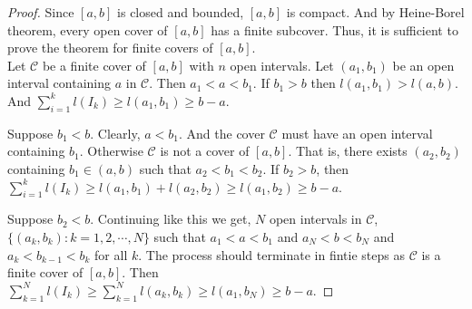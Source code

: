\begin{enumerate}
\begin{proof}
		Since $[a,b]$ is closed and bounded, $[a,b]$ is compact. And by Heine-Borel theorem, every open cover of $[a,b]$ has a finite subcover. Thus, it is sufficient to prove the theorem for finite covers of $[a,b]$.\\

		Let $\mathcal{C}$ be a finite cover of $[a,b]$ with $n$ open intervals. Let $(a_1,b_1)$ be an open interval containing $a$ in $\mathcal{C}$. Then $a_1 < a < b_1$. If $b_1 > b$ then $l(a_1,b_1) > l(a,b)$. And $\sum_{i=1}^k l(I_k) \ge l(a_1,b_1) \ge b-a$.

\begin{center}
\end{center}

		Suppose $b_1 < b$. Clearly, $a < b_1$. And the cover $\mathcal{C}$ must have an open interval containing $b_1$. Otherwise $\mathcal{C}$ is not a cover of $[a,b]$. That is, there exists $(a_2,b_2)$ containing $b_1 \in (a,b)$ such that $a_2 < b_1 < b_2$. If $b_2 > b$, then $\sum_{i=1}^k l(I_k) \ge l(a_1,b_1) + l(a_2,b_2) \ge l(a_1,b_2) \ge b-a$.

\begin{center}
\end{center}

		Suppose $b_2 < b$. Continuing like this we get, $N$ open intervals in $\mathcal{C}$, $\{ (a_k,b_k) : k = 1,2,\cdots,N \} $ such that $a_1 < a < b_1$ and $a_N < b < b_N$ and $a_k < b_{k-1} < b_k$ for all $k$. The process should terminate in fintie steps as $\mathcal{C}$ is a finite cover of $[a,b]$. Then $\sum_{k=1}^N l(I_k) \ge \sum_{k=1}^N l(a_k,b_k) \ge l(a_1,b_N) \ge b-a$.


\end{proof}
\end{enumerate}
